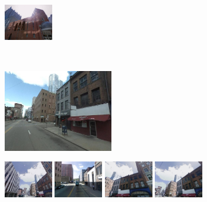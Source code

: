 \documentclass[10pt,twocolumn,letterpaper]{article}
\begin{document}
\begin{figure}[t!]
\begin{minipage}{0.75\linewidth}
\begin{minipage}{\linewidth}
                   \colorbox{myRed}{\includegraphics[height=16mm]{imgs/ex3/FV4.jpg}}
               \end{minipage} 
            \end{minipage}
            \vspace{3mm}
            \\
            \begin{minipage}{0.34\linewidth}
               \centering
               \vspace{0mm}
               \includegraphics[height=36mm]{imgs/ex4/query.jpg}
            \end{minipage}
            \begin{minipage}{0.75\linewidth}
               \begin{minipage}{\linewidth} 
                   \colorbox{myGreen}{\includegraphics[height=16mm]{imgs/ex4/FVsvm1.jpg}}
                   \colorbox{myRed}{\includegraphics[height=16mm]{imgs/ex4/FVsvm2.jpg}}
                   \colorbox{myGreen}{\includegraphics[height=16mm]{imgs/ex4/FVsvm5.jpg}}
                   \colorbox{myGreen}{\includegraphics[height=16mm]{imgs/ex4/FVsvm4.jpg}}

\end{minipage}
\end{minipage}
\end{figure}
\end{document}
